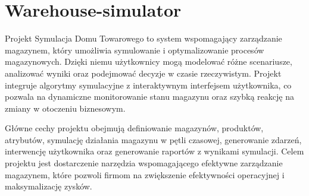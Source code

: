 \chapter{Warehouse-\/simulator}
\hypertarget{md__r_e_a_d_m_e}{}\label{md__r_e_a_d_m_e}
\label{md__r_e_a_d_m_e_autotoc_md0}%
%
 Projekt Symulacja Domu Towarowego to system wspomagający zarządzanie magazynem, który umożliwia symulowanie i optymalizowanie procesów magazynowych. Dzięki niemu użytkownicy mogą modelować różne scenariusze, analizować wyniki oraz podejmować decyzje w czasie rzeczywistym. Projekt integruje algorytmy symulacyjne z interaktywnym interfejsem użytkownika, co pozwala na dynamiczne monitorowanie stanu magazynu oraz szybką reakcję na zmiany w otoczeniu biznesowym.

Główne cechy projektu obejmują definiowanie magazynów, produktów, atrybutów, symulację działania magazynu w pętli czasowej, generowanie zdarzeń, interwencję użytkownika oraz generowanie raportów z wynikami symulacji. Celem projektu jest dostarczenie narzędzia wspomagającego efektywne zarządzanie magazynem, które pozwoli firmom na zwiększenie efektywności operacyjnej i maksymalizację zysków. 